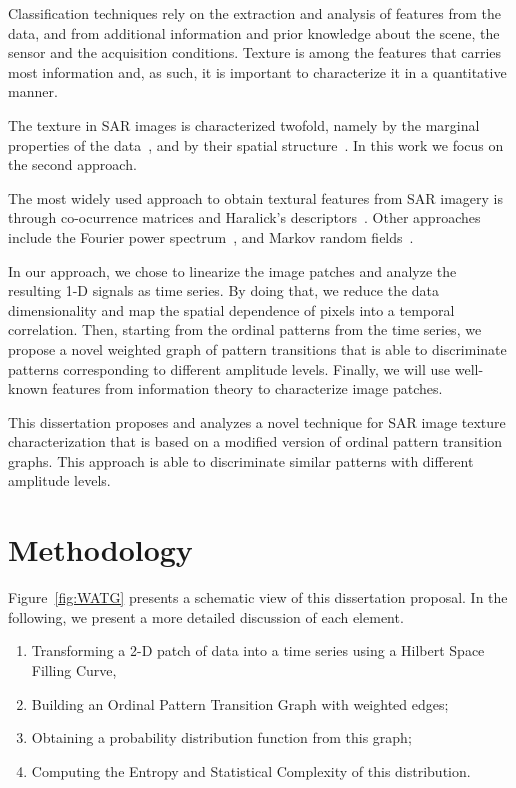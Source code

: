 \documentclass[paper=letter, fontsize=12pt]{article}
\begin{document}
	Classification techniques rely on the extraction and analysis of features from the data, and from additional information and prior knowledge about  the scene, the sensor and the acquisition conditions.
	Texture is among the features that carries most information and, as such, it is important to characterize it in a quantitative manner.
	
	The texture in SAR images is characterized twofold, namely by the marginal properties of the data~\cite{adrian96}, and by their spatial structure~\cite{FeaturesCropDiscrimination}.
	In this work we focus on the second approach.
	
	The most widely used approach to obtain textural features from SAR imagery is through co-ocurrence matrices and Haralick's descriptors~\cite{Zakeri2017Texture}.
	Other approaches include the Fourier power spectrum~\cite{Florindo2012Fractal}, and
	Markov random fields~\cite{Deng2005UnsupervisedSO}.
	
	In our approach, we chose to linearize the image patches and analyze the resulting 1-D signals as time series.
	By doing that, we reduce the data dimensionality and map the spatial dependence of pixels into a temporal correlation.
	Then, starting from the ordinal patterns from the time series, we propose a novel weighted graph of pattern transitions that is able to discriminate patterns corresponding to different amplitude levels.
	Finally, we will use well-known features from information theory to characterize image patches.
	
	This dissertation proposes and analyzes a novel technique for SAR image texture characterization that is based on a modified version of ordinal pattern transition graphs.
	This approach is able to discriminate similar patterns with different amplitude levels. 
	
	\section{Methodology}\label{methodology}
	
	Figure~\ref{fig:WATG} presents a schematic view of this dissertation proposal. 
	In the following, we present a more detailed discussion of each element.
	\begin{enumerate}
		\item\label{item:Linearlize} Transforming a 2-D patch of data into a time series using a Hilbert Space Filling Curve,
		\item\label{item:WOPTG} Building an Ordinal Pattern Transition Graph with weighted edges;
		\item\label{item:Probability} Obtaining a probability distribution function from this graph;
		\item\label{item:Descriptors} Computing the Entropy and Statistical Complexity of this distribution.
	\end{enumerate}
	
\end{document}

